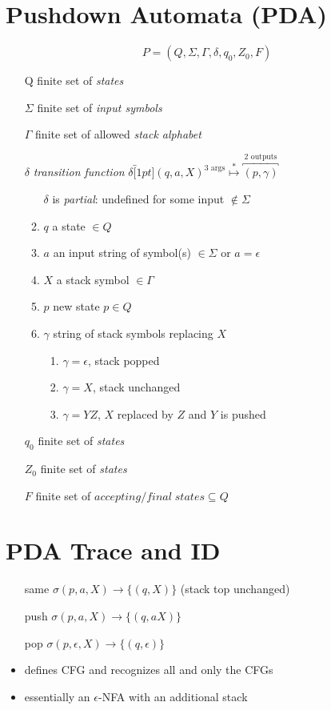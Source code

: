 \documentclass[10pt,a4paper,landscape]{article}
\begin{document}
\begin{multicols*}{3}
\section*{Pushdown Automata (PDA)}
\vspace{0.5em}
\[ P = (Q,\Sigma,\Gamma,\delta,q_{0},Z_{0},F) \]
\begin{itemize}
\item[Q] finite set of \emph{states}
\item[\(\Sigma\)] finite set of \emph{input symbols}
\item[\(\Gamma\)] finite set of allowed \emph{stack alphabet}
\item[\(\delta\)] \emph{transition function}
    \(
\delta\overbracket[1pt]{(q,a,X)}^\text{3 args} \overset{*}{\mapsto} \overbracket{(p,\gamma)}^\text{2 outputs}
  \)
  \begin{enumerate}[leftmargin=1em,labelindent=2em]
  \item[$\delta$] is \emph{partial}: undefined for some input \(\notin \Sigma\)
  \item $q$ a state \(\in Q\)
  \item $a$ an input string of symbol(s) \(\in \Sigma\) or \(a = \epsilon\)
  \item $X$ a stack symbol \(\in \Gamma \)
  \item $p$ new state \(p \in Q\)
  \item $\gamma$ string of stack symbols replacing $X$
    \begin{enumerate}
      \item $\gamma = \epsilon$, stack popped
      \item $\gamma = X$, stack unchanged
      \item $\gamma = YZ$, $X$ replaced by $Z$ and $Y$ is pushed
    \end{enumerate}
  \end{enumerate}
\item[$q_{0}$] finite set of \emph{states}
\item[$Z_{0}$] finite set of \emph{states}
\item[$F$] finite set of \(accepting/final\; states \subseteq Q\)
\end{itemize}
\section*{PDA Trace and ID}
\begin{enumerate}[leftmargin=2.5em,labelindent=2em]
\item [same] \(\sigma(p,a,X) \rightarrow \{(q,X)\}\) (stack top unchanged)
\item [push] \(\sigma(p,a,X) \rightarrow \{(q,aX)\}\)
\item [pop]  \(\sigma(p,\epsilon,X) \rightarrow \{(q,\epsilon)\}\)
\end{enumerate}
\begin{itemize}
\item defines CFG and recognizes all and only the CFGs
\item essentially an \(\epsilon\)-NFA with an additional stack
\end{itemize}

\end{multicols*}
\end{document}
